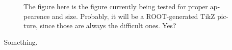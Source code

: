 

\begin{english}


\begin{figure}

\centering
\begin{minipage}[b]{.69\textwidth}
\begin{infilsf} \tiny 

\end{infilsf}
\end{minipage}
\hfill\begin{minipage}[b]{.3\textwidth}
\caption{The figure here is the figure currently being tested for
  proper appearence and size. Probably, it will be a ROOT-generated
  TikZ picture, since those are always the difficult ones. Yes?}
\label{fig:my_label}
\end{minipage}
\end{figure}

Something.

\end{english}
